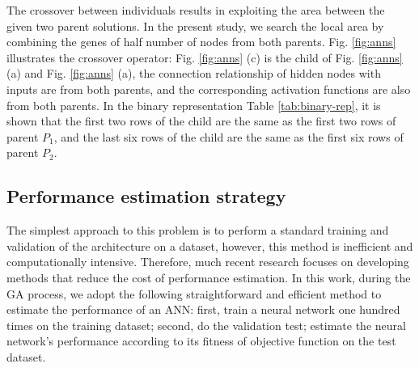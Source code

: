 The crossover between individuals results in exploiting the area between the
given two parent solutions. In the present study, we search the local area by
combining the genes of half number of nodes from both parents.
Fig. \ref{fig:anns} illustrates the crossover operator: Fig. \ref{fig:anns}
(c) is the child of Fig. \ref{fig:anns} (a) and Fig. \ref{fig:anns} (a), the
connection relationship of hidden nodes with inputs are from both parents,  and
the corresponding activation functions are also from both parents. In the
binary representation Table \ref{tab:binary-rep}, it is shown that the first two
rows of the child are the same as the first two rows of parent $P_1$, and the
last six rows of the child are the same as the first six rows of parent $P_2$.

\subsection{Performance estimation strategy}
The simplest approach to this problem is to perform a standard training and
validation of the architecture on a dataset, however, this method is inefficient
and computationally intensive. Therefore, much recent
research\cite{baker2017accelerating} focuses on developing methods that reduce
the cost of performance estimation. In this work, during the GA process, we
adopt the following straightforward and efficient method to estimate the
performance of an ANN: first, train a neural network one hundred times on the
training dataset; second, do the validation test; estimate the neural network's
performance according to its fitness of objective function on the test dataset.  


